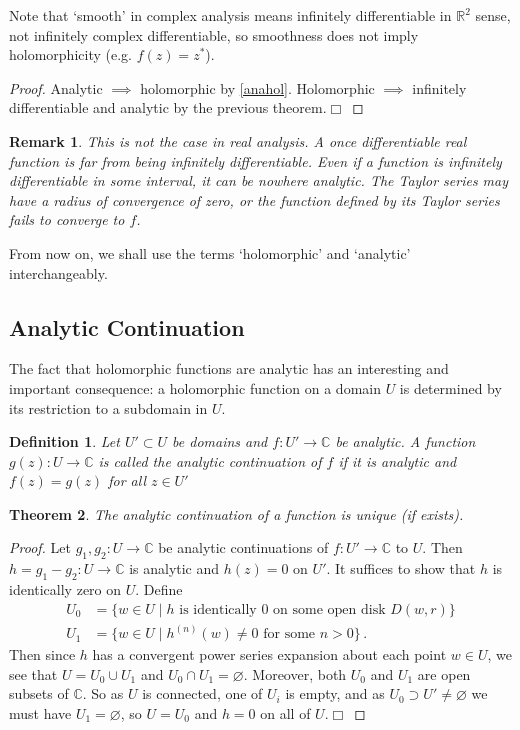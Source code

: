 \documentclass{article}
\theoremstyle{plain}\theoremheaderfont{\normalfont\itshape}\theorembodyfont{\rmfamily}\theoremseparator{.}\newtheorem*{rem}{Remark}\newtheorem*{ex}{Example}\newtheorem*{proof}{Proof}\newtheorem*{altp}{Alternative proof}
\theoremstyle{plain}\theoremheaderfont{\normalfont\bfseries}\theorembodyfont{\rmfamily}\theoremseparator{.}\newtheorem{thm}{Theorem}[section]\newtheorem{lem}[thm]{Lemma}\newtheorem{prop}[thm]{Proposition}\newtheorem*{cor}{Corollary}\newtheorem{defn}[thm]{Definition}\newtheorem{clm}[thm]{Claim}\newtheorem{clminproof}{Claim}
\theoremstyle{break}\theoremheaderfont{\normalfont\itshape}\theorembodyfont{\rmfamily}\theoremseparator{.\medskip}\newtheorem*{proofskip}{Proof}\newtheorem*{exs}{Examples}\newtheorem*{rems}{Remarks}
\theoremstyle{break}\theoremheaderfont{\normalfont\bfseries}\theorembodyfont{\rmfamily}\theoremseparator{.\medskip}\newtheorem{lemskip}[thm]{Lemma}\newtheorem{defnskip}[thm]{Definition}\newtheorem{propskip}[thm]{Proposition}\newtheorem{thmskip}[thm]{Theorem}
\numberwithin{equation}{section}
\newcommand{\qed}{\hfill\ensuremath{\Box}}
\begin{document}
	Note that `smooth' in complex analysis means infinitely differentiable in \(\mathbb{R}^2\) sense, not infinitely complex differentiable, so smoothness does not imply holomorphicity (e.g. \(f(z)=z^*\)).
	\begin{proof}
		Analytic \(\implies\) holomorphic by \cref{anahol}. Holomorphic \(\implies\) infinitely differentiable and analytic by the previous theorem.\qed
	\end{proof}
	\begin{rem}
		This is not the case in real analysis. A once differentiable real function is far from being infinitely differentiable. Even if a function is infinitely differentiable in some interval, it can be nowhere analytic. The Taylor series may have a radius of convergence of zero, or the function defined by its Taylor series fails to converge to \(f\).
	\end{rem}

	From now on, we shall use the terms `holomorphic' and `analytic' interchangeably.

	\subsection{Analytic Continuation}
	The fact that holomorphic functions are analytic has an interesting and important consequence: a holomorphic function on a domain \(U\) is determined by its restriction to a subdomain in \(U\).
	\begin{defn}
		Let \(U'\subset U\) be domains and \(f:U'\to\mathbb{C}\) be analytic. A function \(g(z):U\to\mathbb{C}\) is called the \textit{analytic continuation} of \(f\) if it is analytic and \(f(z)=g(z)\) for all \(z\in U'\)
	\end{defn}

	\begin{thm}
		The analytic continuation of a function is unique (if exists).
	\end{thm}
	\begin{proof}
		Let \(g_1,g_2:U\to\mathbb{C}\) be analytic continuations of \(f:U'\to\mathbb{C}\) to \(U\). Then \(h=g_1-g_2:U\to\mathbb{C}\) is analytic and \(h(z)=0\) on \(U'\). It suffices to show that \(h\) is identically zero on \(U\). Define
		\begin{align*}
			U_0&=\{w\in U\mid h\text{ is identically 0 on some open disk }D(w,r)\}\\
			U_1&=\{w\in U\mid h^{(n)}(w)\ne 0\text{ for some }n>0\}\,.
		\end{align*}
		Then since \(h\) has a convergent power series expansion about each point \(w\in U\), we see that \(U=U_0\cup U_1\) and \(U_0\cap U_1=\varnothing\). Moreover, both \(U_0\) and \(U_1\) are open subsets of \(\mathbb{C}\). So as \(U\) is connected, one of \(U_i\) is empty, and as \(U_0\supset U'\ne\varnothing\) we must have \(U_1=\varnothing\), so \(U=U_0\) and \(h=0\) on all of \(U\).\qed
	\end{proof}
\end{document}
